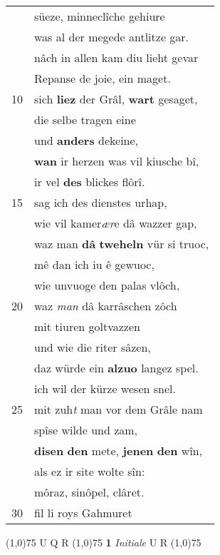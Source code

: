 \documentclass[8pt,a4paper,notitlepage]{article}
\begin{document}
\begin{table}[ht]
\begin{minipage}[t]{0.5\linewidth}
\begin{tabular}{rl}
 & süeze, minneclîche gehiure\\ 
 & was al der megede antlitze gar.\\ 
 & nâch in allen kam diu lieht gevar\\ 
 & Repanse de joie, ein maget.\\ 
10 & sich \textbf{liez} der Grâl, \textbf{wart} gesaget,\\ 
 & die selbe tragen eine\\ 
 & und \textbf{anders} dekeine,\\ 
 & \textbf{wan} ir herzen was vil kiusche bî,\\ 
 & ir vel \textbf{des} blickes flôrî.\\ 
15 & sag ich des dienstes urhap,\\ 
 & wie vil kamer\textit{ær}e dâ wazzer gap,\\ 
 & waz man \textbf{dâ} \textbf{tweheln} vür si truoc,\\ 
 & mê dan ich iu ê gewuoc,\\ 
 & wie unvuoge den palas vlôch,\\ 
20 & waz \textit{man} dâ karrâschen zôch\\ 
 & mit tiuren goltvazzen\\ 
 & und wie die riter sâzen,\\ 
 & daz würde ein \textbf{alzuo} langez spel.\\ 
 & ich wil der kürze wesen snel.\\ 
25 & mit zuh\textit{t} man vor dem Grâle nam\\ 
 & spîse wilde und zam,\\ 
 & \textbf{disen} \textbf{den} mete, \textbf{jenen} \textbf{den} wîn,\\ 
 & als ez ir site wolte sîn:\\ 
 & môraz, sinôpel, clâret.\\ 
30 & fil li roys Gahmuret\\ 
\end{tabular}
\scriptsize
\line(1,0){75} \newline
U Q R \newline
\line(1,0){75} \newline
\textbf{1} \textit{Initiale} U R  \newline
\line(1,0){75} \newline

\end{minipage}
\end{table}
\end{document}
